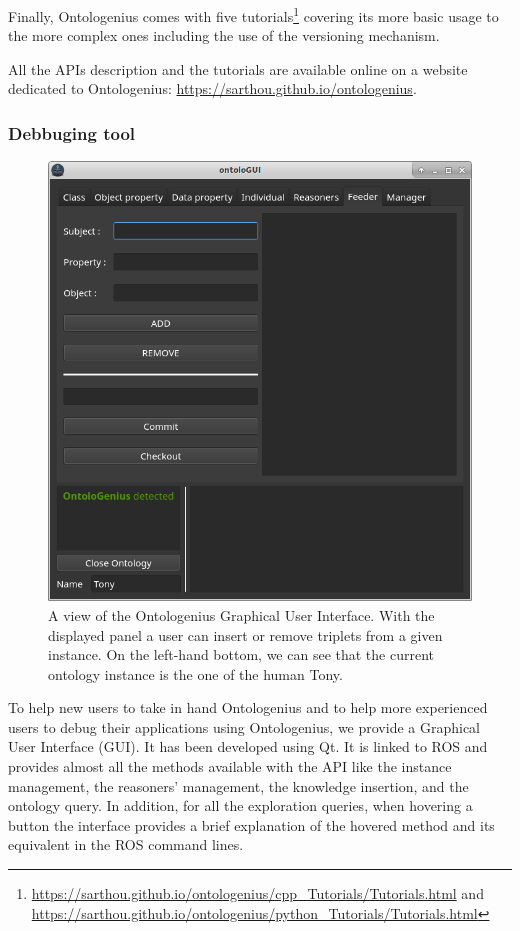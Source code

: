 Finally, Ontologenius comes with five tutorials\footnote{\url{https://sarthou.github.io/ontologenius/cpp_Tutorials/Tutorials.html} and \url{https://sarthou.github.io/ontologenius/python_Tutorials/Tutorials.html}} covering its more basic usage to the more complex ones including the use of the versioning mechanism.

All the APIs description and the tutorials are available online on a website dedicated to Ontologenius: \url{https://sarthou.github.io/ontologenius}.

\subsubsection{Debbuging tool}

\begin{figure}[ht!]
\centering
\includegraphics[scale=0.48]{figures/chapter2/ontologui.png}
\caption{\label{fig:chap2_ontologui} A view of the Ontologenius Graphical User Interface. With the displayed panel a user can insert or remove triplets from a given instance. On the left-hand bottom, we can see that the current ontology instance is the one of the human Tony.}
\end{figure}

To help new users to take in hand Ontologenius and to help more experienced users to debug their applications using Ontologenius, we provide a Graphical User Interface (GUI). It has been developed using Qt. It is linked to ROS and provides almost all the methods available with the API like the instance management, the reasoners' management, the knowledge insertion, and the ontology query. In addition, for all the exploration queries, when hovering a button the interface provides a brief explanation of the hovered method and its equivalent in the ROS command lines.

